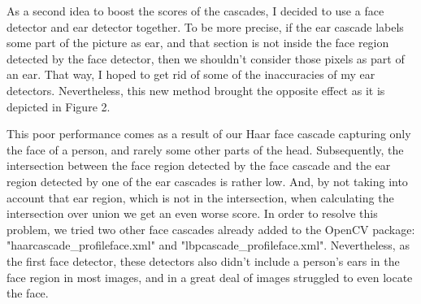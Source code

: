 \documentclass[9pt]{IEEEtran}
\begin{document}
As a second idea to boost the scores of the cascades, I decided to use a face detector and ear detector together. To be more precise, if the ear cascade labels some part of the picture as ear, and that section is not inside the face region detected by the face detector, then we shouldn't consider those pixels as part of an ear. That way, I hoped to get rid of some of the inaccuracies of my ear detectors. Nevertheless, this new method brought the opposite effect as it is depicted in Figure 2.

This poor performance comes as a result of our Haar face cascade capturing only the face of a person, and rarely some other parts of the head. Subsequently, the intersection between the face region detected by the face cascade and the ear region detected by one of the ear cascades is rather low. And, by not taking into account that ear region, which is not in the intersection, when calculating the intersection over union we get an even worse score. In order to resolve this problem, we tried two other face cascades already added to the OpenCV package: "haarcascade\_profileface.xml" and "lbpcascade\_profileface.xml". Nevertheless, as the first face detector, these detectors also didn't include a person's ears in the face region in most images, and in a great deal of images struggled to even locate the face.
\end{document}
